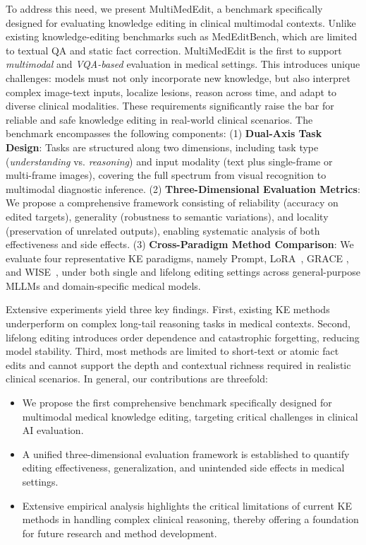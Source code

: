 \documentclass[letterpaper]{article} %
\begin{document}
To address this need, we present MultiMedEdit, a benchmark specifically designed for evaluating knowledge editing in clinical multimodal contexts. Unlike existing knowledge-editing benchmarks such as MedEditBench, which are limited to textual QA and static fact correction. MultiMedEdit is the first to support \textit{multimodal} and \textit{VQA-based} evaluation in medical settings. This introduces unique challenges: models must not only incorporate new knowledge, but also interpret complex image-text inputs, localize lesions, reason across time, and adapt to diverse clinical modalities. These requirements significantly raise the bar for reliable and safe knowledge editing in real-world clinical scenarios.
The benchmark encompasses the following components:
(1) \textbf{Dual-Axis Task Design}: Tasks are structured along two dimensions, including task type (\textit{understanding} vs. \textit{reasoning}) and input modality (text plus single-frame or multi-frame images), covering the full spectrum from visual recognition to multimodal diagnostic inference.
(2) \textbf{Three-Dimensional Evaluation Metrics}: We propose a comprehensive framework consisting of reliability (accuracy on edited targets), generality (robustness to semantic variations), and locality (preservation of unrelated outputs), enabling systematic analysis of both effectiveness and side effects.
(3) \textbf{Cross-Paradigm Method Comparison}: We evaluate four representative KE paradigms, namely Prompt, LoRA~\citep{zhang2023adalora}, GRACE \citep{wang2024grace}, and WISE~\cite{wang2024wise}, under both single and lifelong editing settings across general-purpose MLLMs and domain-specific medical models.

Extensive experiments yield three key findings. First, existing KE methods underperform on complex long-tail reasoning tasks in medical contexts. Second, lifelong editing introduces order dependence and catastrophic forgetting, reducing model stability. Third, most methods are limited to short-text or atomic fact edits and cannot support the depth and contextual richness required in realistic clinical scenarios. In general, our contributions are threefold:
\begin{itemize}
    \item We propose the first comprehensive benchmark specifically designed for multimodal medical knowledge editing, targeting critical challenges in clinical AI evaluation.
    \item A unified three-dimensional evaluation framework is established to quantify editing effectiveness, generalization, and unintended side effects in medical settings.
    \item Extensive empirical analysis highlights the critical limitations of current KE methods in handling complex clinical reasoning, thereby offering a foundation for future research and method development.
\end{itemize}
\end{document}
